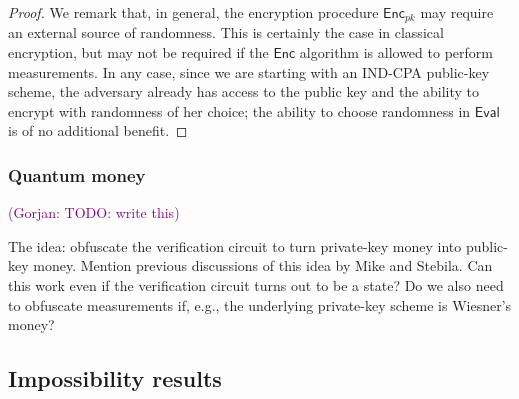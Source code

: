 \documentclass[11pt]{article}
\numberwithin{equation}{section}
\newcommand{\Enc}{\ensuremath{\mathsf{Enc}}\xspace}
\newcommand\Eval{\ensuremath{\mathsf{Eval}}\xspace}
\newcommand{\ga}[1]{{ \textcolor{purple}{(Gorjan:  #1)}}{}}
\begin{document}
\begin{proof}
We remark that, in general, the encryption procedure $\Enc_{pk}$ may require an external source of randomness. This is certainly the case in classical encryption, but may not be required if the $\Enc$ algorithm is allowed to perform measurements. In any case, since we are starting with an IND-CPA public-key scheme, the adversary already has access to the public key and the ability to encrypt with randomness of her choice; the ability to choose randomness in $\Eval$ is of no additional benefit.
\end{proof}

\subsubsection{Quantum money}

\ga{TODO: write this}

The idea: obfuscate the verification circuit to turn private-key money into public-key money. Mention previous discussions of this idea by Mike and Stebila. Can this work even if the verification circuit turns out to be a state? Do we also need to obfuscate measurements if, e.g., the underlying private-key scheme is Wiesner's money?

\subsection{Impossibility results}\label{vbb:impossibility}
\end{document}
